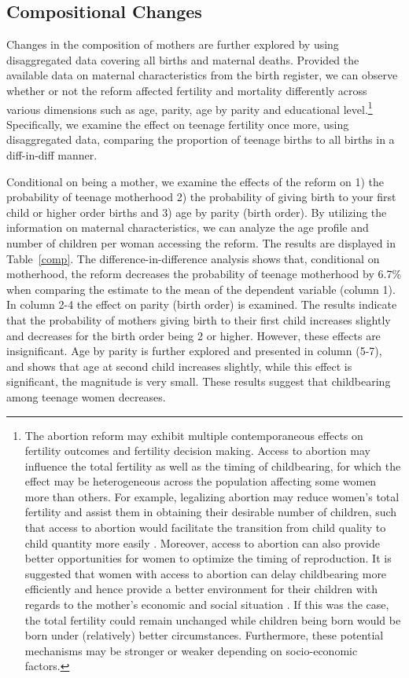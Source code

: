 \documentclass[a4paper, 11pt]{article}
\begin{document}
\begin{spacing}{2}
\subsection{Compositional Changes}\label{CompositionalChanges}
Changes in the composition of mothers are further explored by using disaggregated data covering all births and maternal deaths. Provided the available data on maternal characteristics from the birth register, we can observe whether or not the reform affected fertility and mortality differently across various dimensions such as age, parity, age by parity and educational level.\footnote{The abortion reform may exhibit multiple contemporaneous effects on fertility outcomes and fertility decision making. Access to abortion may influence the total fertility as well as the timing of childbearing, for which the effect may be heterogeneous across the population affecting some women more than others. For example, legalizing abortion may reduce women’s total fertility and assist them in obtaining their desirable number of children, such that access to abortion would facilitate the transition from child quality to child quantity more easily \citep{becker1974interaction}. Moreover, access to abortion can also provide better opportunities for women to optimize the timing of reproduction. It is suggested that women with access to abortion can delay childbearing more efficiently and hence provide a better environment for their children with regards to the mother’s economic and social situation \citep{DonohueLevitt2001}. If this was the case, the total fertility could remain unchanged while children being born would be born under (relatively) better circumstances. Furthermore, these potential mechanisms may be stronger or weaker depending on socio-economic factors.} Specifically, we examine the effect on teenage fertility once more, using disaggregated data, comparing the proportion of teenage births to all births in a diff-in-diff manner.   

 Conditional on being a mother, we examine the effects of the reform on 1) the probability of teenage motherhood 2) the probability of giving birth to your first child or higher order births and 3) age by parity (birth order). By utilizing the information on maternal characteristics, we can analyze the age profile and number of children per woman accessing the reform. The results are displayed in Table~\ref{comp}. The difference-in-difference analysis shows that, conditional on motherhood, the reform decreases the probability of teenage motherhood by 6.7\% when comparing the estimate to the mean of the dependent variable (column 1). In column 2-4 the effect on parity (birth order) is examined. The results indicate that the probability of mothers giving birth to their first child increases slightly and decreases for the birth order being 2 or higher. However, these effects are insignificant. Age by parity is further explored and presented in column (5-7), and shows that age at second child increases slightly, while this effect is significant, the magnitude is very small. These results suggest that childbearing among teenage women decreases.  


\end{spacing}
\end{document}
